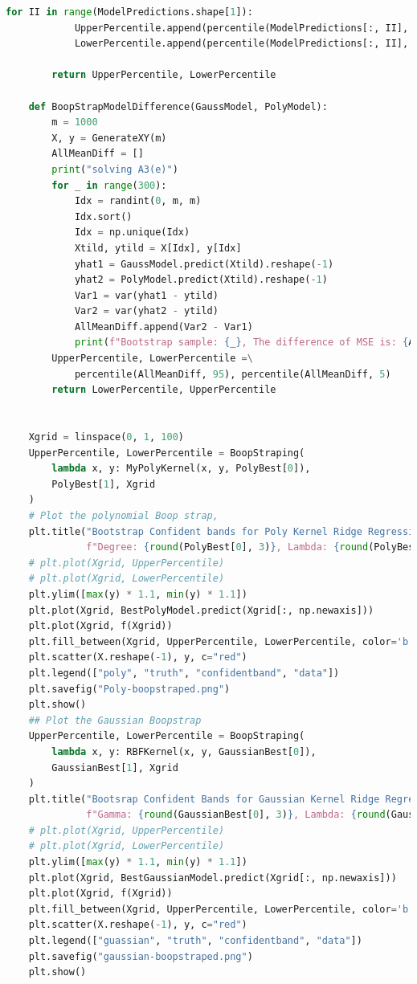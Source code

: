 \documentclass[]{article}
\begin{document}
\begin{lstlisting}[language=python]
        for II in range(ModelPredictions.shape[1]):
            UpperPercentile.append(percentile(ModelPredictions[:, II], 95))
            LowerPercentile.append(percentile(ModelPredictions[:, II], 5))

        return UpperPercentile, LowerPercentile

    def BoopStrapModelDifference(GaussModel, PolyModel):
        m = 1000
        X, y = GenerateXY(m)
        AllMeanDiff = []
        print("solving A3(e)")
        for _ in range(300):
            Idx = randint(0, m, m)
            Idx.sort()
            Idx = np.unique(Idx)
            Xtild, ytild = X[Idx], y[Idx]
            yhat1 = GaussModel.predict(Xtild).reshape(-1)
            yhat2 = PolyModel.predict(Xtild).reshape(-1)
            Var1 = var(yhat1 - ytild)
            Var2 = var(yhat2 - ytild)
            AllMeanDiff.append(Var2 - Var1)
            print(f"Bootstrap sample: {_}, The difference of MSE is: {AllMeanDiff[-1]}")
        UpperPercentile, LowerPercentile =\
            percentile(AllMeanDiff, 95), percentile(AllMeanDiff, 5)
        return LowerPercentile, UpperPercentile


    Xgrid = linspace(0, 1, 100)
    UpperPercentile, LowerPercentile = BoopStraping(
        lambda x, y: MyPolyKernel(x, y, PolyBest[0]),
        PolyBest[1], Xgrid
    )
    # Plot the polynomial Boop strap,
    plt.title("Bootstrap Confident bands for Poly Kernel Ridge Regression\n "
              f"Degree: {round(PolyBest[0], 3)}, Lambda: {round(PolyBest[1], 3)}, 95, 5 % interval")
    # plt.plot(Xgrid, UpperPercentile)
    # plt.plot(Xgrid, LowerPercentile)
    plt.ylim([max(y) * 1.1, min(y) * 1.1])
    plt.plot(Xgrid, BestPolyModel.predict(Xgrid[:, np.newaxis]))
    plt.plot(Xgrid, f(Xgrid))
    plt.fill_between(Xgrid, UpperPercentile, LowerPercentile, color='b', alpha=.1)
    plt.scatter(X.reshape(-1), y, c="red")
    plt.legend(["poly", "truth", "confidentband", "data"])
    plt.savefig("Poly-boopstraped.png")
    plt.show()
    ## Plot the Gaussian Boopstrap
    UpperPercentile, LowerPercentile = BoopStraping(
        lambda x, y: RBFKernel(x, y, GaussianBest[0]),
        GaussianBest[1], Xgrid
    )
    plt.title("Bootsrap Confident Bands for Gaussian Kernel Ridge Regression\n"
              f"Gamma: {round(GaussianBest[0], 3)}, Lambda: {round(GaussianBest[1], 3)}, 95, 5 % interval")
    # plt.plot(Xgrid, UpperPercentile)
    # plt.plot(Xgrid, LowerPercentile)
    plt.ylim([max(y) * 1.1, min(y) * 1.1])
    plt.plot(Xgrid, BestGaussianModel.predict(Xgrid[:, np.newaxis]))
    plt.plot(Xgrid, f(Xgrid))
    plt.fill_between(Xgrid, UpperPercentile, LowerPercentile, color='b', alpha=.1)
    plt.scatter(X.reshape(-1), y, c="red")
    plt.legend(["guassian", "truth", "confidentband", "data"])
    plt.savefig("gaussian-boopstraped.png")
    plt.show()


\end{lstlisting}
\end{document}
